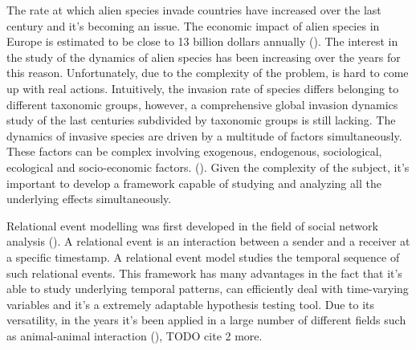 \documentclass[mscthesis]{usiinfthesis}
\begin{document}
The rate at which alien species invade countries have increased over the last century and it's becoming an issue. The economic impact of alien species in Europe is estimated to be close to 13 billion dollars annually (\cite{intro:rate}). The interest in the study of the dynamics of alien species has been increasing over the years for this reason. Unfortunately, due to the complexity of the problem, is hard to come up with real actions. Intuitively, the invasion rate of species differs belonging to different taxonomic groups, however, a comprehensive global invasion dynamics study of the last centuries subdivided by taxonomic groups is still lacking. The dynamics of invasive species are driven by a multitude of factors simultaneously. These factors can be complex involving exogenous, endogenous, sociological, ecological and socio-economic factors. (\citet{intro:factors}). Given the complexity of the subject, it's important to develop a framework capable of studying and analyzing all the underlying effects simultaneously. 

Relational event modelling was first developed in the field of social network analysis (\citet{rem:butts}). A relational event is an interaction between a sender and a receiver at a specific timestamp. A relational event model studies the temporal sequence of such relational events. This framework has many advantages in the fact that it's able to study underlying temporal patterns, can efficiently deal with time-varying variables and it's a extremely adaptable hypothesis testing tool. Due to its versatility, in the years it's been applied in a large number of different fields such as animal-animal interaction (\citet{intro:cattle}), TODO cite 2 more.

%
\end{document}
